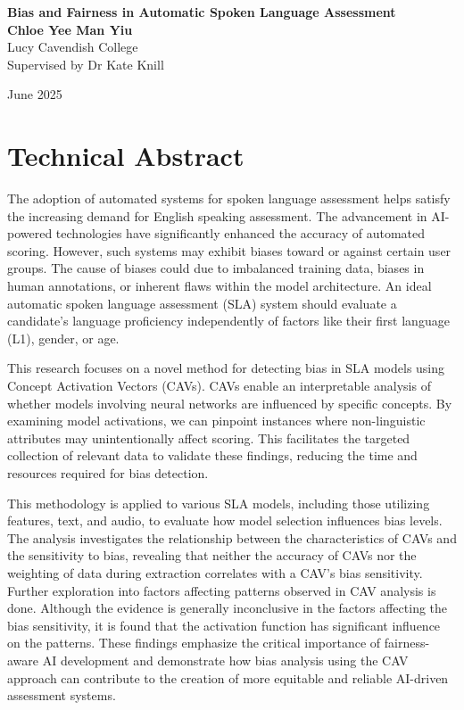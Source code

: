 \begin{center}
    \Large
    \textbf{Bias and Fairness in Automatic Spoken Language Assessment}
    \vspace{0.2in} \\

    \normalsize
    \textbf{Chloe Yee Man Yiu} \\
    Lucy Cavendish College \\
    Supervised by Dr Kate Knill
    \vspace{0.1in}

    June 2025
\end{center}

\section*{Technical Abstract}
The adoption of automated systems for spoken language assessment helps satisfy the increasing demand for English speaking assessment. The advancement in AI-powered technologies have significantly enhanced the accuracy of automated scoring. However, such systems may exhibit biases toward or against certain user groups. The cause of biases could due to imbalanced training data, biases in human annotations, or inherent flaws within the model architecture. An ideal automatic spoken language assessment (SLA) system should evaluate a candidate's language proficiency independently of factors like their first language (L1), gender, or age.

This research focuses on a novel method for detecting bias in SLA models using Concept Activation Vectors (CAVs). CAVs enable an interpretable analysis of whether models involving neural networks are influenced by specific concepts. By examining model activations, we can pinpoint instances where non-linguistic attributes may unintentionally affect scoring. This facilitates the targeted collection of relevant data to validate these findings, reducing the time and resources required for bias detection.

This methodology is applied to various SLA models, including those utilizing features, text, and audio, to evaluate how model selection influences bias levels. The analysis investigates the relationship between the characteristics of CAVs and the sensitivity to bias, revealing that neither the accuracy of CAVs nor the weighting of data during extraction correlates with a CAV's bias sensitivity. Further exploration into factors affecting patterns observed in CAV analysis is done. Although the evidence is generally inconclusive in the factors affecting the bias sensitivity, it is found that the activation function has significant influence on the patterns. These findings emphasize the critical importance of fairness-aware AI development and demonstrate how bias analysis using the CAV approach can contribute to the creation of more equitable and reliable AI-driven assessment systems.

\clearpage
